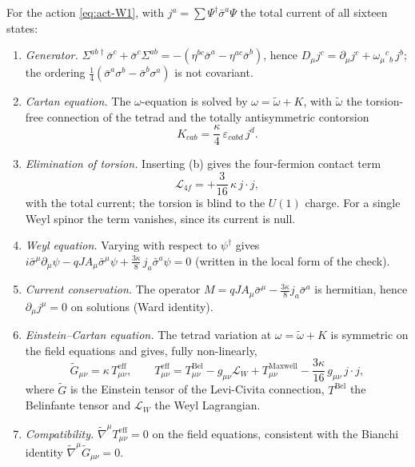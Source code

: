 \begin{proposition}
\label{prop:act-fieldeq}
For the action \eqref{eq:act-W1}, with $j^a=\sum\Psi^\dagger\bar\sigma^a\Psi$ the total current of all sixteen states:
\begin{enumerate}
\item[(a)] \emph{Generator.} $\Sigma^{ab\dagger}\bar\sigma^c+\bar\sigma^c\Sigma^{ab}=-(\eta^{bc}\bar\sigma^a-\eta^{ac}\bar\sigma^b)$, hence
  $D_\mu j^c=\partial_\mu j^c+\omega_\mu{}^c{}_b\,j^b$; the ordering $\tfrac14(\bar\sigma^a\sigma^b-\bar\sigma^b\sigma^a)$ is not covariant.
\item[(b)] \emph{Cartan equation.} The $\omega$-equation is solved by $\omega=\tilde\omega+K$, with $\tilde\omega$ the torsion-free
  connection of the tetrad and the totally antisymmetric contorsion
  \begin{equation}
  K_{cab}=\frac{\kappa}{4}\,\varepsilon_{cabd}\,j^d .
  \label{eq:act-contorsion}
  \end{equation}
\item[(c)] \emph{Elimination of torsion.} Inserting (b) gives the four-fermion contact term
  \begin{equation}
  \mathcal L_{4f}=+\frac{3}{16}\,\kappa\,j\cdot j ,
  \label{eq:act-4f}
  \end{equation}
  with the total current; the torsion is blind to the $U(1)$ charge. For a single Weyl spinor the term vanishes, since its
  current is null.
\item[(d)] \emph{Weyl equation.} Varying with respect to $\psi^\dagger$ gives
  $i\bar\sigma^\mu\partial_\mu\psi-qJA_\mu\bar\sigma^\mu\psi+\tfrac{3\kappa}{8}\,j_a\bar\sigma^a\psi=0$ (written in the local
  form of the check).
\item[(e)] \emph{Current conservation.} The operator $M=qJA_\mu\bar\sigma^\mu-\tfrac{3\kappa}{8}j_a\bar\sigma^a$ is hermitian,
  hence $\partial_\mu j^\mu=0$ on solutions (Ward identity).
\item[(f)] \emph{Einstein--Cartan equation.} The tetrad variation at $\omega=\tilde\omega+K$ is symmetric on the field
  equations and gives, fully non-linearly,
  \begin{equation}
  \tilde G_{\mu\nu}=\kappa\,T^{\mathrm{eff}}_{\mu\nu},\qquad
  T^{\mathrm{eff}}_{\mu\nu}=T^{\mathrm{Bel}}_{\mu\nu}-g_{\mu\nu}\mathcal L_W+T^{\mathrm{Maxwell}}_{\mu\nu}
    -\frac{3\kappa}{16}\,g_{\mu\nu}\,j\cdot j ,
  \label{eq:act-einstein}
  \end{equation}
  where $\tilde G$ is the Einstein tensor of the Levi-Civita connection, $T^{\mathrm{Bel}}$ the Belinfante tensor and
  $\mathcal L_W$ the Weyl Lagrangian.
\item[(g)] \emph{Compatibility.} $\tilde\nabla^\mu T^{\mathrm{eff}}_{\mu\nu}=0$ on the field equations, consistent with the Bianchi
  identity $\tilde\nabla^\mu\tilde G_{\mu\nu}=0$.
\end{enumerate}
\end{proposition}

